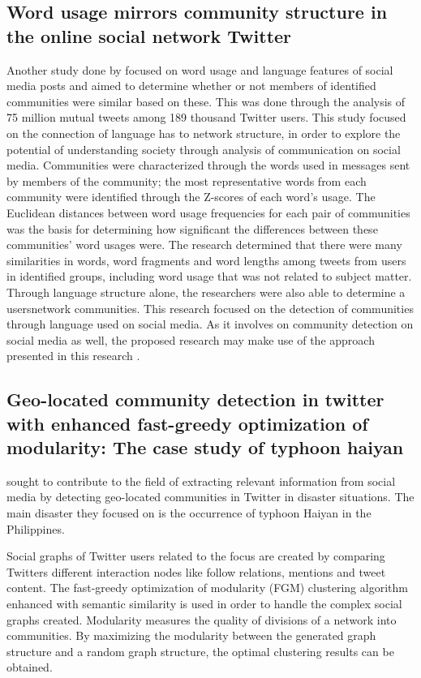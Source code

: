 \subsection{Word usage mirrors community structure in the online social network Twitter}


Another study done by  focused on word usage and language features of social media posts and aimed to determine whether or not members of identified communities were similar based on these. This was done through the analysis of 75 million mutual tweets among 189 thousand Twitter users. This study focused on the connection of language has to network structure, in order to explore the potential of understanding society through analysis of communication on social media. Communities were characterized through the words used in messages sent by members of the community; the most representative words from each community were identified through the Z-scores of each word’s usage. The Euclidean distances between word usage frequencies for each pair of communities was the basis for determining how significant the differences between these communities’ word usages were. The research determined that there were many similarities in words, word fragments and word lengths among tweets from users in identified groups, including word usage that was not related to subject matter. Through language structure alone, the researchers were also able to determine a users\vtick network communities. This research focused on the detection of communities through language used on social media. As it involves on community detection on social media as well, the proposed research may make use of the approach presented in this research \cite{Bryden:2013}.


\subsection{Geo-located community detection in twitter with enhanced fast-greedy optimization of modularity: The case study of typhoon haiyan}


 sought to contribute to the field of extracting relevant information from social media by detecting geo-located communities in Twitter in disaster situations. The main disaster they focused on is the occurrence of typhoon Haiyan in the Philippines. 


Social graphs of Twitter users related to the focus are created by comparing Twitter\vtick s different interaction nodes like follow relations, mentions and tweet content. The fast-greedy optimization of modularity (FGM) clustering algorithm enhanced with semantic similarity is used in order to handle the complex social graphs created. Modularity measures the quality of divisions of a network into communities. By maximizing the modularity between the generated graph structure and a random graph structure, the optimal clustering results can be obtained. 


